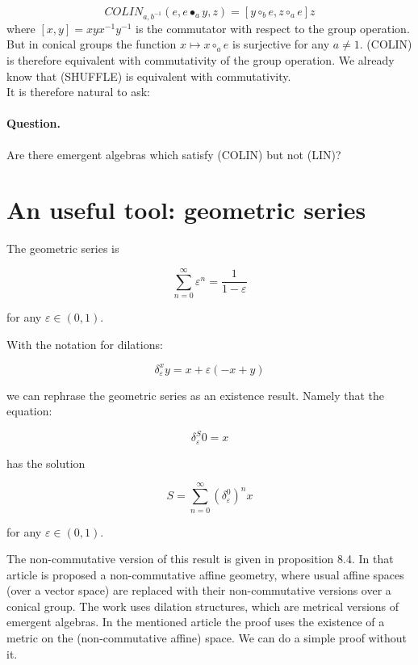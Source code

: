 \documentclass{article}
\begin{document}
$$COLIN_{a,b^{-1}}(e,e \bullet_{a} y,z) = [y \circ_{b} e, z \circ_{a} e] z$$ 
where $\displaystyle [x,y] = x y x^{-1} y^{-1}$ is the commutator with respect to the group operation. But in conical groups the function $\displaystyle x \mapsto x \circ_{a} e$ is surjective for any $a \not = 1$. (COLIN) is therefore equivalent with commutativity of the group operation. We already know that (SHUFFLE) is equivalent with commutativity. \\ 




It is therefore natural to ask: 

\paragraph{Question.} Are there emergent algebras which satisfy (COLIN) but not (LIN)? \\ 


\section{An useful tool: geometric series}


The geometric series is



$$ \sum_{n=0}^{\infty} \varepsilon^{n}  = \frac{1}{1-\varepsilon}$$



for any $\varepsilon \in (0,1)$. 



With the notation for dilations: 



$$ \delta^{x}_{\varepsilon} y = x + \varepsilon (-x+y)$$



we can rephrase the geometric series as an existence result. Namely that the equation: 



$$ \delta^{S}_{\varepsilon} 0 = x $$



has the solution 



$$ S = \sum_{n=0}^{\infty} \left( \delta^{0}_{\varepsilon}\right)^{n} x$$



for any $\varepsilon \in (0,1)$. 



The non-commutative version of this result is given in \cite{buligainf} proposition 8.4. 
In that article is proposed a non-commutative affine geometry, where usual affine spaces (over a vector space) are replaced with their non-commutative versions over a conical group.  The work uses dilation structures, which are metrical versions of emergent algebras. In the mentioned article  the proof uses the existence of a metric on the (non-commutative affine) space. We can do a simple proof without it. 
\end{document}
